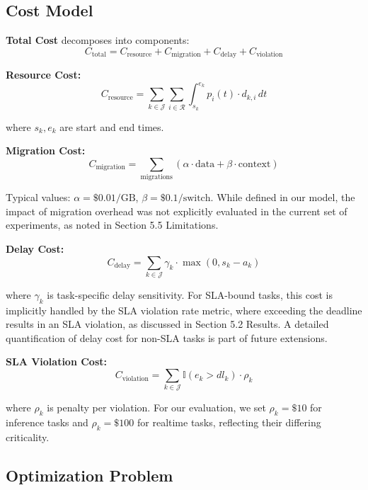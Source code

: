 \documentclass[10pt,conference]{IEEEtran}
\begin{document}
\subsection{Cost Model}

\textbf{Total Cost} decomposes into components:
\begin{equation}
C_{\text{total}} = C_{\text{resource}} + C_{\text{migration}} + C_{\text{delay}} + C_{\text{violation}}
\end{equation}

\textbf{Resource Cost:}
\begin{equation}
C_{\text{resource}} = \sum_{k \in \mathcal{J}} \sum_{i \in \mathcal{R}} \int_{s_k}^{e_k} p_i(t) \cdot d_{k,i} \, dt
\end{equation}

where $s_k, e_k$ are start and end times.

\textbf{Migration Cost:}
\begin{equation}
C_{\text{migration}} = \sum_{\text{migrations}} (\alpha \cdot \text{data} + \beta \cdot \text{context})
\end{equation}

Typical values: $\alpha = \$0.01/\text{GB}$, $\beta = \$0.1/\text{switch}$. While defined in our model, the impact of migration overhead was not explicitly evaluated in the current set of experiments, as noted in Section 5.5 Limitations.

\textbf{Delay Cost:}
\begin{equation}
C_{\text{delay}} = \sum_{k \in \mathcal{J}} \gamma_k \cdot \max(0, s_k - a_k)
\end{equation}

where $\gamma_k$ is task-specific delay sensitivity. For SLA-bound tasks, this cost is implicitly handled by the SLA violation rate metric, where exceeding the deadline results in an SLA violation, as discussed in Section 5.2 Results. A detailed quantification of delay cost for non-SLA tasks is part of future extensions.

\textbf{SLA Violation Cost:}
\begin{equation}
C_{\text{violation}} = \sum_{k \in \mathcal{J}} \mathbb{I}(e_k > dl_k) \cdot \rho_k
\end{equation}

where $\rho_k$ is penalty per violation. For our evaluation, we set $\rho_k = \$10$ for inference tasks and $\rho_k = \$100$ for realtime tasks, reflecting their differing criticality.

\subsection{Optimization Problem}
\end{document}
